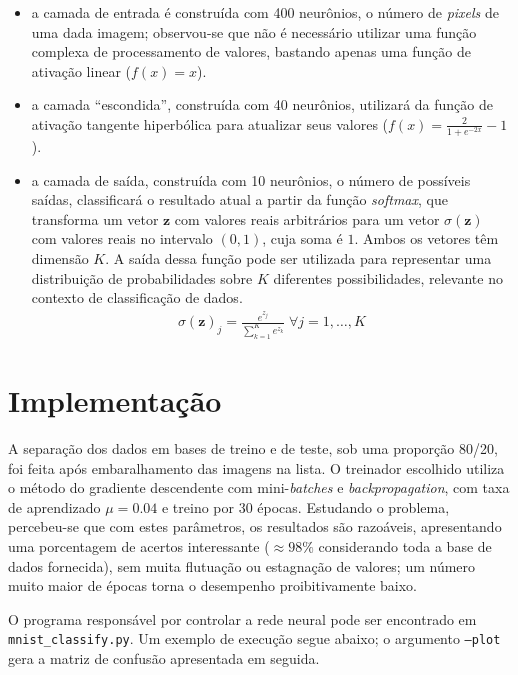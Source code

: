 \documentclass{article}
\begin{document}
\begin{itemize}
    \item a camada de entrada é construída com 400 neurônios, o número de
        \emph{pixels} de uma dada imagem; observou-se que não é necessário
        utilizar uma função complexa de processamento de valores, bastando
        apenas uma função de ativação linear ($f(x) = x$).

    \item a camada ``escondida'', construída com 40 neurônios, utilizará da
        função de ativação tangente hiperbólica para atualizar seus valores
        ($f(x) = \frac{2}{1 + e^{-2x}} -1$).

    \item a camada de saída, construída com 10 neurônios, o número de possíveis
        saídas, classificará o resultado atual a partir da função
        \emph{softmax}, que transforma um vetor $\mathbf{z}$ com valores reais
        arbitrários para um vetor $\sigma(\mathbf{z})$ com valores reais no
        intervalo $(0, 1)$, cuja soma é $1$. Ambos os vetores têm dimensão $K$.
        A saída dessa função pode ser utilizada para representar uma
        distribuição de probabilidades sobre $K$ diferentes possibilidades,
        relevante no contexto de classificação de dados.
        \begin{align*}
            \sigma(\mathbf{z})_j = \frac{e^{z_j}}{\sum_{k=1}^K e^{z_k}}
            \; \forall j = 1, \ldots, K
        \end{align*}
\end{itemize}

\section{Implementação}

A separação dos dados em bases de treino e de teste, sob uma proporção 80/20,
foi feita após embaralhamento das imagens na lista. O treinador escolhido
utiliza o método do gradiente descendente com mini-\emph{batches} e
\emph{backpropagation}, com taxa de aprendizado $\mu = 0.04$ e treino por $30$
épocas. Estudando o problema, percebeu-se que com estes parâmetros, os
resultados são razoáveis, apresentando uma porcentagem de acertos interessante
($\approx 98\%$ considerando toda a base de dados fornecida), sem muita
flutuação ou estagnação de valores; um número muito maior de épocas torna o
desempenho proibitivamente baixo. \medskip

O programa responsável por controlar a rede neural pode ser encontrado em
\texttt{mnist\_classify.py}. Um exemplo de execução segue abaixo; o argumento
\texttt{--plot} gera a matriz de confusão apresentada em seguida.
\end{document}
